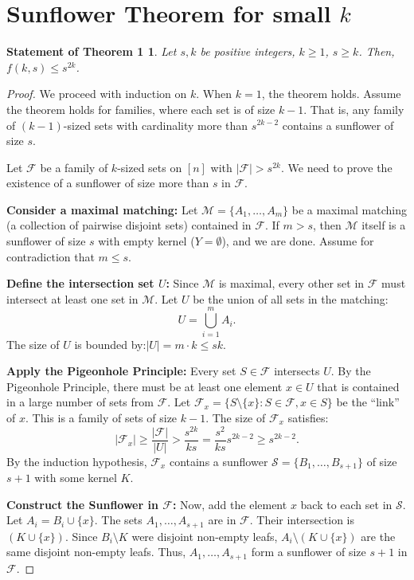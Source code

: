 \documentclass[runningheads,12pt,a4paper]{article}
\newtheorem*{statement}{Statement of Theorem 1}
\begin{document}
\section{Sunflower Theorem for small $k$}
\begin{statement}
	Let $s,k$ be  positive integers,  $k \geq 1$, $s \geq k$. Then, $f(k,s) \leq s^{2k}$.
\end{statement}
\begin{proof}
	We proceed with induction on $k$.
	When $k=1$, the theorem holds. Assume the theorem holds for families, where each set is of size $k-1$. That is, any family of $(k-1)$-sized sets with cardinality more than $s^{2k-2}$ contains a sunflower of size $s$. 
	
	Let $\mathcal{F}$ be a family of $k$-sized sets on $[n]$ with $|\mathcal{F}| > s^{2k}$. We need to prove the existence of a sunflower of size more than $s$ in $\mathcal{F}$. 
	
	\noindent \textbf{Consider a maximal matching:}
	Let $\mathcal{M} = \{A_1, \dots, A_m\}$ be a maximal matching (a collection of pairwise disjoint sets) contained in $\mathcal{F}$.
	If $m > s$, then $\mathcal{M}$ itself is a sunflower of size $s$ with empty kernel ($Y = \emptyset$), and we are done. Assume for contradiction that $m \le s$.
	
	\noindent \textbf{Define the intersection set $U$:}
	Since $\mathcal{M}$ is maximal, every other set in $\mathcal{F}$ must intersect at least one set in $\mathcal{M}$. Let $U$ be the union of all sets in the matching:$$U = \bigcup_{i=1}^m A_i.$$
	The size of $U$ is bounded by:$|U| = m \cdot k \le sk.$
	
	\noindent \textbf{Apply the Pigeonhole Principle:} 
	Every set $S \in \mathcal{F}$ intersects $U$. By the Pigeonhole Principle, there must be at least one element $x \in U$ that is contained in a large number of sets from $\mathcal{F}$. Let $\mathcal{F}_x = \{ S \setminus \{x\} : S \in \mathcal{F}, x \in S \}$ be the ``link'' of $x$. This is a family of sets of size $k-1$. The size of $\mathcal{F}_x$ satisfies:$$|\mathcal{F}_x| \ge \frac{|\mathcal{F}|}{|U|} > \frac{s^{2k}}{ks}= \frac{s^2}{ks} s^{2k-2}\geq s^{2k-2}.$$
	By the induction hypothesis, $\mathcal{F}_x$ contains a sunflower $\mathcal{S} = \{B_1, \dots, B_{s+1}\}$ of size $s+1$ with some kernel $K$.
	
	\noindent \textbf{Construct the Sunflower in $\mathcal{F}$:}
	Now, add the element $x$ back to each set in $\mathcal{S}$. Let $A_i = B_i \cup \{x\}$. The sets $A_1, \dots, A_{s+1}$ are in $\mathcal{F}$. Their intersection is $(K \cup \{x\})$. Since $B_i \setminus K$ were disjoint non-empty leafs, $A_i \setminus (K \cup \{x\})$ are the same disjoint non-empty leafs. Thus, $A_1, \dots, A_{s+1}$ form a sunflower of size $s+1$ in $\mathcal{F}$.
	
\end{proof}
\end{document}
